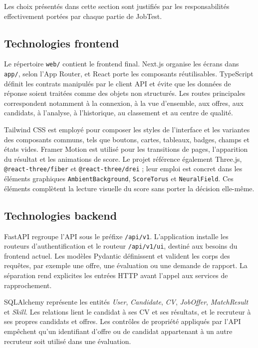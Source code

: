 Les choix présentés dans cette section sont justifiés par les responsabilités effectivement portées par chaque partie de JobTest.

\subsection{Technologies frontend}

Le répertoire \texttt{web/} contient le frontend final. Next.js organise les écrans dans \texttt{app/}, selon l'App Router, et React porte les composants réutilisables. TypeScript définit les contrats manipulés par le client API et évite que les données de réponse soient traitées comme des objets non structurés. Les routes principales correspondent notamment à la connexion, à la vue d'ensemble, aux offres, aux candidats, à l'analyse, à l'historique, au classement et au centre de qualité.

Tailwind CSS est employé pour composer les styles de l'interface et les variantes des composants communs, tels que boutons, cartes, tableaux, badges, champs et états vides. Framer Motion est utilisé pour les transitions de pages, l'apparition du résultat et les animations de score. Le projet référence également Three.js, \texttt{@react-three/fiber} et \texttt{@react-three/drei} ; leur emploi est concret dans les éléments graphiques \texttt{AmbientBackground}, \texttt{ScoreTorus} et \texttt{NeuralField}. Ces éléments complètent la lecture visuelle du score sans porter la décision elle-même.

\subsection{Technologies backend}

FastAPI regroupe l'API sous le préfixe \texttt{/api/v1}. L'application installe les routeurs d'authentification et le routeur \texttt{/api/v1/ui}, destiné aux besoins du frontend actuel. Les modèles Pydantic définissent et valident les corps des requêtes, par exemple une offre, une évaluation ou une demande de rapport. La séparation rend explicites les entrées HTTP avant l'appel aux services de rapprochement.

SQLAlchemy représente les entités \emph{User}, \emph{Candidate}, \emph{CV}, \emph{JobOffer}, \emph{MatchResult} et \emph{Skill}. Les relations lient le candidat à ses CV et ses résultats, et le recruteur à ses propres candidats et offres. Les contrôles de propriété appliqués par l'API empêchent qu'un identifiant d'offre ou de candidat appartenant à un autre recruteur soit utilisé dans une évaluation.

